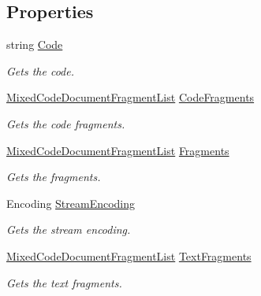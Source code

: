 \subsection*{Properties}
\begin{DoxyCompactItemize}
\item 
string \hyperlink{class_html_agility_pack_1_1_mixed_code_document_a8295c69e9cd60ccd925321b028bcdaee}{Code}
\begin{DoxyCompactList}\small\item\em Gets the code. \end{DoxyCompactList}\item 
\hyperlink{class_html_agility_pack_1_1_mixed_code_document_fragment_list}{Mixed\+Code\+Document\+Fragment\+List} \hyperlink{class_html_agility_pack_1_1_mixed_code_document_a72bff321c598b027cb63141def4a6130}{Code\+Fragments}
\begin{DoxyCompactList}\small\item\em Gets the code fragments. \end{DoxyCompactList}\item 
\hyperlink{class_html_agility_pack_1_1_mixed_code_document_fragment_list}{Mixed\+Code\+Document\+Fragment\+List} \hyperlink{class_html_agility_pack_1_1_mixed_code_document_ac4bf2dc75e1e79c8cdd57ea68b5d721c}{Fragments}
\begin{DoxyCompactList}\small\item\em Gets the fragments. \end{DoxyCompactList}\item 
Encoding \hyperlink{class_html_agility_pack_1_1_mixed_code_document_a3a0fe1737480646febba148cd4848305}{Stream\+Encoding}
\begin{DoxyCompactList}\small\item\em Gets the stream encoding. \end{DoxyCompactList}\item 
\hyperlink{class_html_agility_pack_1_1_mixed_code_document_fragment_list}{Mixed\+Code\+Document\+Fragment\+List} \hyperlink{class_html_agility_pack_1_1_mixed_code_document_ab94764beed2d88709c596a6b1946cbef}{Text\+Fragments}
\begin{DoxyCompactList}\small\item\em Gets the text fragments. \end{DoxyCompactList}\end{DoxyCompactItemize}


